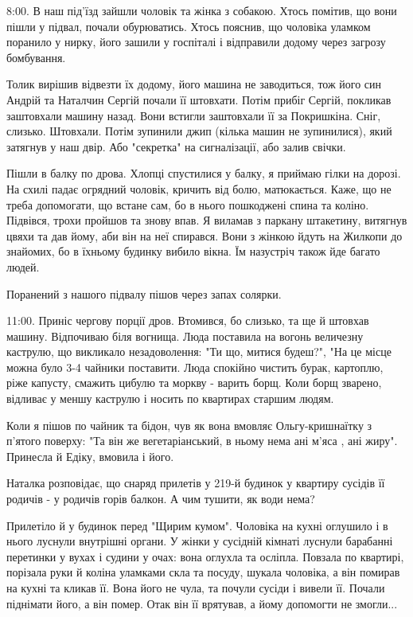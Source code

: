 8:00. В наш під'їзд зайшли чоловік та жінка з собакою. Хтось помітив, що вони
пішли у підвал, почали обурюватись. Хтось пояснив, що чоловіка уламком поранило
у нирку, його зашили у госпіталі і відправили додому через загрозу бомбування. 

Толик вирішив відвезти їх додому, його машина не заводиться, тож його син
Андрій та Наталчин Сергій почали її штовхати. Потім прибіг Сергій, покликав
заштовхали машину назад. Вони встигли заштовхали її за Покришкіна. Сніг,
слизько. Штовхали. Потім зупинили джип (кілька машин не зупинилися), який
затягнув у наш двір. Або "секретка" на сигналізації, або залив свічки.

Пішли в балку по дрова. Хлопці спустилися у балку, я приймаю гілки на дорозі.
На схилі падає огрядний чоловік, кричить від болю, матюкається. Каже,  що не
треба допомогати,  що встане сам, бо в нього пошкоджені спина та коліно.
Підвівся, трохи пройшов та знову впав. Я виламав з паркану штакетину, витягнув
цвяхи та дав йому, аби він на неї спирався. Вони з жінкою йдуть на Жилкопи до
знайомих, бо в їхньому будинку вибило вікна. Їм назустріч також йде багато
людей.

Поранений з нашого підвалу пішов через запах солярки. 

11:00. Приніс чергову порції дров. Втомився, бо слизько, та ще й штовхав
машину. Відпочиваю біля вогнища. Люда поставила на вогонь величезну каструлю,
що викликало незадоволення: "Ти що, митися будеш?", "На це місце можна було 3-4
чайники поставити. Люда спокійно чистить бурак, картоплю, ріже капусту,
смажить  цибулю та моркву - варить борщ. Коли борщ зварено, відливає у меншу
каструлю і носить по квартирах  старшим людям.

Коли я пішов по чайник та бідон, чув як вона вмовляє Ольгу-кришнаїтку з п'ятого
поверху: "Та він же вегетаріанський, в ньому нема ані м'яса , ані жиру".
Принесла й Едіку, вмовила і його. 

Наталка  розповідає, що снаряд прилетів у 219-й будинок у квартиру сусідів її
родичів - у родичів горів балкон. А чим тушити, як води нема?

Прилетіло й у будинок перед "Щирим кумом". Чоловіка на кухні оглушило і в нього
луснули внутрішні органи. У жінки у сусідній кімнаті луснули барабанні
перетинки у вухах і судини у очах: вона оглухла та осліпла. Повзала по
квартирі, порізала руки й коліна уламками скла та посуду, шукала чоловіка, а
він помирав на кухні та кликав її. Вона його не чула, та почули сусіди і вивели
її. Почали піднімати його, а він помер. Отак він її врятував, а йому допомогти
не змогли...

